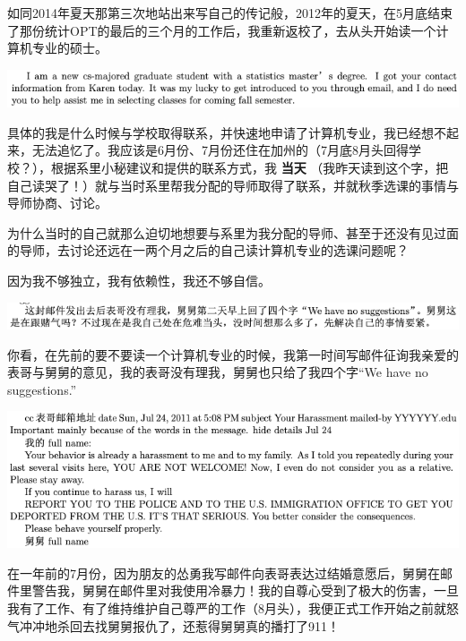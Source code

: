\documentclass[9pt, b5paper]{article}
\begin{document}
如同2014年夏天那第三次地站出来写自己的传记般，2012年的夏天，在5月底结束了那份统计OPT的最后的三个月的工作后，我重新返校了，去从头开始读一个计算机专业的硕士。

\begin{center}
\includegraphics[width=.9\linewidth]{./pic/backups_plans_20210419_103028.png}
\end{center}

具体的我是什么时候与学校取得联系，并快速地申请了计算机专业，我已经想不起来，无法追忆了。我应该是6月份、7月份还住在加州的（7月底8月头回得学校？），根据系里小秘建议和提供的联系方式，我 \textbf{当天} （我昨天读到这个字，把自己读哭了！）就与当时系里帮我分配的导师取得了联系，并就秋季选课的事情与导师协商、讨论。

为什么当时的自己就那么迫切地想要与系里为我分配的导师、甚至于还没有见过面的导师，去讨论还远在一两个月之后的自己读计算机专业的选课问题呢？

因为我不够独立，我有依赖性，我还不够自信。

\begin{center}
\includegraphics[width=.9\linewidth]{./pic/backups_plans_20210419_103828.png}
\end{center}

你看，在先前的要不要读一个计算机专业的时候，我第一时间写邮件征询我亲爱的表哥与舅舅的意见，我的表哥没有理我，舅舅也只给了我四个字“We have no suggestions.”

\begin{center}
\includegraphics[width=.9\linewidth]{./pic/backups_plans_20210419_104129.png}
\end{center}

在一年前的7月份，因为朋友的怂勇我写邮件向表哥表达过结婚意愿后，舅舅在邮件里警告我，舅舅在邮件里对我使用冷暴力！我的自尊心受到了极大的伤害，一旦我有了工作、有了维持维护自己尊严的工作（8月头），我便正式工作开始之前就怒气冲冲地杀回去找舅舅报仇了，还惹得舅舅真的播打了911！
\end{document}
